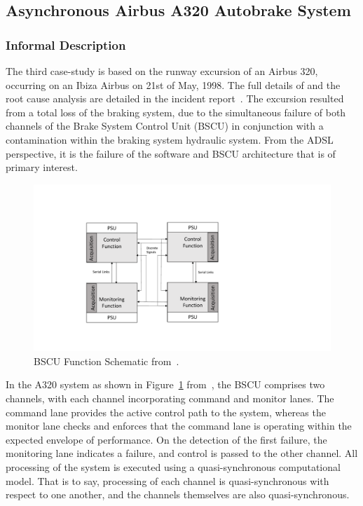 \subsection{Asynchronous  Airbus A320 Autobrake System}
\label{airbuscs}

\subsubsection{Informal Description}

The third  case-study is based on the runway excursion of an Airbus 320, occurring on
an Ibiza Airbus on 21st of May, 1998.  The full details of and the root cause
analysis are detailed in the incident report~\cite{a320ibiza}.  The excursion
resulted from a total loss of the braking system, due to the simultaneous
failure of  both channels of the Brake System Control Unit (BSCU) in conjunction
with a contamination within the braking system hydraulic system. From the ADSL
perspective, it is the failure of the software and BSCU architecture that is of
primary interest.

\begin{figure}
\begin{center}
\includegraphics[width=\textwidth]{figures/BSCU.pdf}
\caption{BSCU Function Schematic from~\cite{a320ibiza}.}
\label{fig:BSCU_schematic}
\end{center}
\end{figure}

In the A320 system as shown in Figure~\ref{fig:BSCU_schematic} from~\cite{a320ibiza}, the BSCU comprises two channels, with each channel incorporating command and monitor lanes.  The command lane provides the active
control path to the system, whereas the monitor lane checks and enforces that
the command lane is operating within the expected envelope of performance. On
the detection of the first failure, the monitoring lane indicates a failure, and
control is passed to the other channel.  All processing of the system is
executed using a quasi-synchronous computational model. That is to say,
processing of each channel is quasi-synchronous with respect to one another,
and the channels themselves are also quasi-synchronous.

